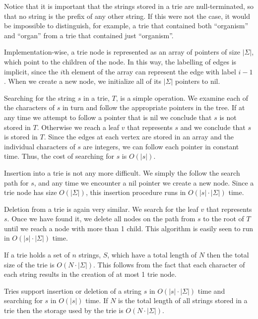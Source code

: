 Notice that it is important that the strings stored in a trie are
null-terminated, so that no string is the prefix of any other string.
If this were not the case, it would be impossible to distinguish, for
example, a trie that contained both ``organism'' and ``organ'' from a
trie that contained just ``organism''.

Implementation-wise, a trie node is represented as an array of pointers of
size $|\Sigma|$, which point to the children of the node.  In this way,
the labelling of edges is implicit, since the $i$th element of the array
can represent the edge with label $i-1$.  When we create a new node,
we initialize all of its $|\Sigma|$ pointers to nil.

Searching for the string $s$ in a trie, $T$, is a simple operation.  We
examine each of the characters of $s$ in turn and follow the appropriate
pointers in the tree.  If at any time we attempt to follow a pointer
that is nil we conclude that $s$ is not stored in $T$.  Otherwise we
reach a leaf $v$ that represents $s$ and we conclude that $s$ is stored
in $T$.  Since the edges at each vertex are stored in an array and the
individual characters of $s$ are integers, we can follow each pointer
in constant time.  Thus, the cost of searching for $s$ is $O(|s|)$.

Insertion into a trie is not any more difficult.  We simply the follow the
search path for $s$, and any time we encounter a nil pointer we create
a new node.  Since a trie node has size $O(|\Sigma|)$, this insertion
procedure runs in $O(|s|\cdot|\Sigma|)$ time.

Deletion from a trie is again very similar. We search for the leaf $v$
that represents $s$.  Once we have found it, we delete all nodes on the
path from $s$ to the root of $T$ until we reach a node with more than
1 child.  This algorithm is easily seen to run in $O(|s|\cdot|\Sigma|)$
time.

If a trie holds a set of $n$ strings, $S$, which have a total length of
$N$ then the total size of the trie is $O(N\cdot|\Sigma|)$.  This follows
from the fact that each character of each string results in the creation
of at most 1 trie node.

\begin{thm}
Tries support insertion or
deletion of a string $s$ in $O(|s|\cdot|\Sigma|)$ time and searching for $s$ in $O(|s|)$ time.
If $N$ is the total length of all strings stored in a trie then the
storage used by the trie is $O(N\cdot|\Sigma|)$.
\end{thm}


